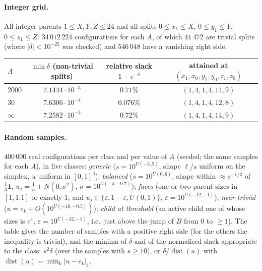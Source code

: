 \documentclass[11pt]{article}
\theoremstyle{definition}
\numberwithin{equation}{section}
\newcommand{\one}{\mathbf 1}
\begin{document}
\paragraph{Integer grid.} All integer parents $1\le X,Y,Z\le24$ and all splits $0\le x_1\le X$, $0\le y_1\le Y$, $0\le z_1\le Z$:
$34\,012\,224$ configurations for each $A$, of which $41\,472$ are trivial splits (where $|\delta|<10^{-25}$ was checked) and
$546\,048$ have a vanishing right side.

\begin{center}
\begin{tabular}{lccc}
\toprule
$A$ & $\min\delta$ (non-trivial splits) & relative slack $1-e^{-\delta}$ & attained at $(x_1,x_0,y_1,y_0,z_1,z_0)$\\
\midrule
$2000$ & $7.1444\cdot10^{-3}$ & $0.71\%$ & $(1,4,1,4,14,9)$\\
$30$ & $7.6306\cdot10^{-4}$ & $0.076\%$ & $(1,4,1,4,12,8)$\\
$\infty$ & $7.2582\cdot10^{-3}$ & $0.72\%$ & $(1,4,1,4,14,9)$\\
\bottomrule
\end{tabular}
\end{center}

\paragraph{Random samples.} $400\,000$ real configurations per class and per value of $A$ (seeded; the same samples for each
$A$), in five classes: \emph{generic} ($s=10^{U(-3,5)}$, shape $\ell/s$ uniform on the simplex, $u$ uniform in $[0,1]^3$);
\emph{balanced} ($s=10^{U(0,6)}$, shape within $\approx s^{-1/2}$ of $\frac13\one$, $u_j=\frac13+N(0,\sigma^2)$,
$\sigma=10^{U(-4,-0.7)}$); \emph{faces} (one or two parent sizes in $[1,1.1]$ or exactly $1$, and $u_j\in\{\varepsilon,1-\varepsilon,
U(0,1)\}$, $\varepsilon=10^{U(-12,-1)}$); \emph{near-trivial} ($u=e_k+O(10^{U(-10,-0.5)})$); \emph{child at threshold}
(an active child one of whose sizes is $e^{\varepsilon}$, $\varepsilon=10^{U(-12,-1)}$, i.e.\ just above the jump of $B$ from $0$
to $\ge1$). The table gives the number of samples with a positive right side (for the others the inequality is trivial), and the
minima of $\delta$ and of the normalised slack appropriate to the class: $s^2\delta$ (over the samples with $s\ge10$), or
$\delta/\operatorname{dist}(u)$ with $\operatorname{dist}(u)=\min_k|u-e_k|_1$.
\end{document}
